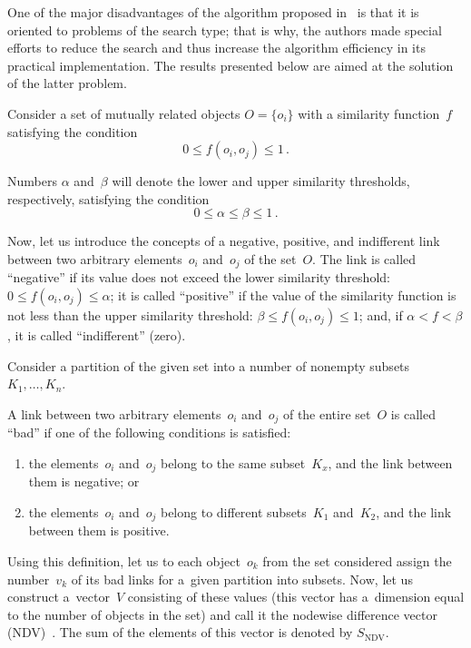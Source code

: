 \begin{multicols}{2}
     One of the major disadvantages of the algorithm proposed in~\cite{4-d} is 
that it is oriented to problems of the search type; that is why, the authors made 
special efforts to reduce the search and thus increase the algorithm efficiency in its 
practical implementation. The results presented below are aimed at the solution of 
the latter problem.
     
     Consider a set of mutually related objects $O = \{o_i\}$ with a similarity 
function~$f$~\cite{3-d} satisfying the condition
     $$
     0\leq f\left( o_i, o_j\right)\leq 1\,.
     $$
     
     Numbers $\alpha$ and~$\beta$ will denote the lower and upper similarity 
thresholds, respectively, satisfying the condition
     $$
     0\leq \alpha\leq \beta\leq 1\,.
     $$
     
    Now, let us introduce the concepts of a negative, positive, and indifferent link 
between two arbitrary elements~$o_i$ and~$o_j$ of the set~$O$. The link is called 
``negative'' if its value does not exceed the lower similarity threshold: $0\leq 
f(o_i,o_j)\leq \alpha$; it is called ``positive'' if the value of the similarity function is 
not less than the upper similarity threshold: $\beta\leq f(o_i,o_j)\leq 1$; and, if 
$\alpha<f<\beta$, it is called ``indifferent'' (zero).
     
     Consider a partition of the given set into a number of nonempty subsets 
$K_1,\ldots , K_n$.
     
     A link between two arbitrary elements~$o_i$ and~$o_j$ of the entire 
set~$O$ is called ``bad'' if one of the following conditions is satisfied:
     \begin{enumerate}[(1)] 
     \item the elements~$o_i$ and~$o_j$ belong to the same subset~$K_x$, and 
the link between them is negative; or
\item the elements~$o_i$ and~$o_j$ belong to different subsets~$K_1$ 
and~$K_2$, and the link between them is positive.
\end{enumerate}

     Using this definition, let us to each object~$o_k$ from the set 
considered   assign the number~$v_k$ of its bad links for a~given partition into subsets. 
Now, let us construct a~vector~$V$ consisting of these values (this vector has 
a~dimension equal to the number of objects in the set) and call it the nodewise 
difference vector (NDV)~\cite{4-d}. The sum of the elements of this vector is 
denoted by $S_{\mathrm{NDV}}$.
     

\end{multicols}
